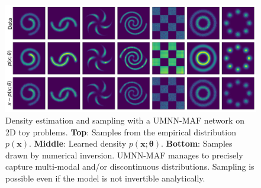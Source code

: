 

\begin{figure}
    \centering
    \includegraphics[width=.85\textwidth]{figures/chapter05/toy/all_flow.png}
    \vspace{-0.75em}
    \caption{Density estimation and sampling with a UMNN-MAF network on 2D toy problems. \textbf{Top}: Samples from the empirical distribution $p(\mathbf{x})$. \textbf{Middle}: Learned density $p(\mathbf{x};\mathbf{\theta})$. \textbf{Bottom}: Samples drawn by numerical inversion.
    UMNN-MAF manages to precisely capture multi-modal and/or discontinuous distributions.
    Sampling is possible even if the model is not invertible analytically.}
    \label{fig:toys}
\end{figure}
